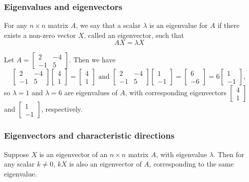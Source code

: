 \documentclass[11pt,t]{beamer}
\begin{document}
\begin{frame}
\frametitle{Eigenvalues and eigenvectors}
\begin{definition}
For any $n\times n$ matrix $A$, we say that a scalar $\lambda$ is an \alert{eigenvalue} for $A$ if there exists a non-zero vector $X$, called an \alert{eigenvector}, such that
\[
AX=\lambda X
\]
\end{definition}
\begin{example}
Let $A = \begin{bmatrix}2&-4\\-1&5\end{bmatrix}$. Then we have
\[
\begin{bmatrix}2&-4\\-1&5\end{bmatrix}\begin{bmatrix}4\\1\end{bmatrix} = \begin{bmatrix}4\\1\end{bmatrix} \text{ and } \begin{bmatrix}2&-4\\-1&5\end{bmatrix}\begin{bmatrix}1\\-1\end{bmatrix} = \begin{bmatrix}6\\-6\end{bmatrix} = 6\begin{bmatrix}1\\-1\end{bmatrix},
\]
so $\lambda =1$ and  $\lambda = 6$ are eigenvalues of $A$, with corresponding eigenvectors $\begin{bmatrix}4\\1\end{bmatrix}$ and $\begin{bmatrix}1\\-1\end{bmatrix}$, respectively.
\end{example}
\end{frame}
\begin{frame}
\frametitle{Eigenvectors and characteristic directions}

\begin{theorem}
Suppose $X$ is an eigenvector of an $n\times n$ matrix $A$, with eigenvalue $\lambda$. Then for any scalar $k\neq 0$, $kX$ is also an eigenvector of $A$, corresponding to the same eigenvalue.
\end{theorem}
\end{frame}
\end{document}
